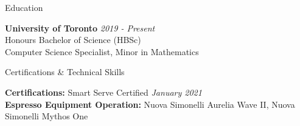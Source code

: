 \documentclass[
	11pt, %
]{resume} %
\begin{document}


\begin{rSection}{Education}

	\textbf{University of Toronto} \hfill \textit{2019 - Present} \\
	Honours Bachelor of Science (HBSc)\\
	Computer Science Specialist, Minor in Mathematics \\
\end{rSection}


\begin{rSection}{Certifications \& Technical Skills}

	\textbf{Certifications:} Smart Serve Certified \hfill \textit{January 2021} \\
	\textbf{Espresso Equipment Operation:} Nuova Simonelli Aurelia Wave II, Nuova Simonelli Mythos One \\

\end{rSection}

\end{document}
